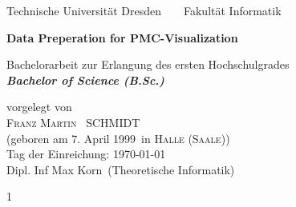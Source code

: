 \documentclass[a4paper,12pt,leqno]{article}
\newcommand{\name}{Schmidt}
\newcommand{\vorname}{Franz Martin}
\newcommand{\gebdatum}{7. April 1999}
\newcommand{\ort}{Halle (Saale)}
\newcommand{\betreuer}{Dipl. Inf Max Korn}
\newcommand{\institut}{Theoretische Informatik}
\newcommand{\thema}{Data Preperation for PMC-Visualization}
\newcommand{\datum}{\today} %
\begin{document}


\thispagestyle{empty}

\begin{center}
{\Large Technische Universit\"{a}t Dresden\  \ \textbullet\ \ Fakult\"{a}t Informatik}

\vfil

{\bfseries\Huge\thema}

\vfil
{\LARGE
Bachelorarbeit zur Erlangung des ersten Hochschulgrades \\[\bigskipamount]
\bfseries{\itshape Bachelor of Science (B.Sc.)}\\[\bigskipamount]
}

\vfil\vfil

\vfil

vorgelegt von
\\[\bigskipamount]
\textsc{\vorname\ } \MakeUppercase{\name}
\\[\bigskipamount]
(geboren am \gebdatum\ in \textsc{\ort})
\\[\bigskipamount]
Tag der Einreichung: \datum
\\[\bigskipamount]
\betreuer\ (\institut)
\end{center}

\cleardoublepage

\tableofcontents

\thispagestyle{empty}
\cleardoublepage


\setcounter{page}1





























%


\end{document}
